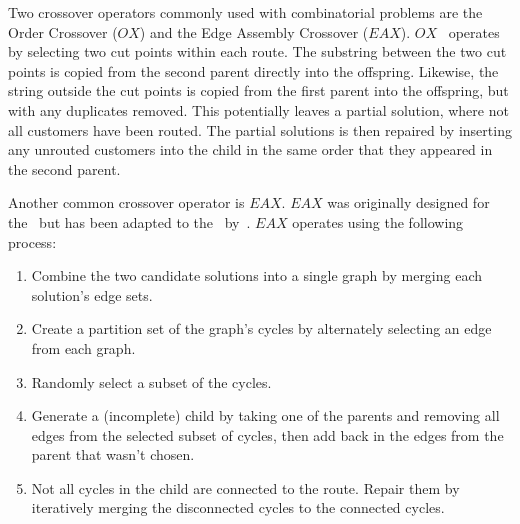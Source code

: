 Two crossover operators commonly used with combinatorial problems are the Order Crossover ($OX$) and the Edge Assembly Crossover ($EAX$). $OX$~\cite{OSH:1987} operates by selecting two cut points within each route. The substring between the two cut points is copied from the second parent directly into the offspring. Likewise, the string outside the cut points is copied from the first parent into the offspring, but with any duplicates removed. This potentially leaves a partial solution, where not all customers have been routed. The partial solutions is then repaired by inserting any unrouted customers into the child in the same order that they appeared in the second parent.


Another common crossover operator is $EAX$. $EAX$ was originally designed for the \TSP\ but has been adapted to the \VRP\ by~\cite{Nagata:2007}. $EAX$ operates using the following process:

\begin{enumerate}
    \item Combine the two candidate solutions into a single graph by merging each solution's edge sets.
    \item Create a partition set of the graph's cycles by alternately selecting an edge from each graph.
    \item Randomly select a subset of the cycles.
    \item Generate a (incomplete) child by taking one of the parents and removing all edges from the selected subset of cycles, then add back in the edges from the parent that wasn't chosen. 
    \item Not all cycles in the child are connected to the route. Repair them by iteratively merging the disconnected cycles to the connected cycles.
\end{enumerate}


